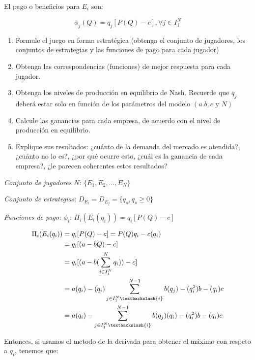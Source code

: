 \documentclass{homework}
\begin{document}
El pago o beneficios para $E_i$ son:

\begin{equation}
    \phi_j(Q) = q_j [P(Q)-c], \forall j \in I_{1}^{N}
\end{equation}


\begin{enumerate}
    \item Formule el juego en forma estratégica (obtenga el conjunto de jugadores, los conjuntos de estrategias y las funciones de pago para cada jugador)
    \item Obtenga las correspondencias (funciones) de mejor respuesta para cada jugador.
    \item Obtenga los niveles de producción en equilibrio de Nash. Recuerde que $q_j$ deberá estar solo en función de los parámetros del modelo $(a.b,c\text{ y } N) $
    \item Calcule las ganancias para cada empresa, de acuerdo con el nivel de producción en equilibrio.
    \item Explique sus resultados: ¿cuánto de la demanda del mercado es atendida?, ¿cuánto no lo es?, ¿por qué ocurre esto, ¿cuál es la ganancia de cada empresa?, ¿le parecen coherentes estos resultados?
\end{enumerate}

\emph{Conjunto de jugadores $N$}: $\{ E_1, E_2, \dots, E_N \}$

\emph{Conjunto de estrategias}: $D_{E_i} =   D_{E_j} = \{ q_s, q_s \geq 0\}$

\emph{Funciones de pago: $\phi_i $}: $\Pi_i(E_i(q_i)) =  q_i [P(Q)-c] $

\begin{equation}
\begin{split}
    \Pi_i(E_i(q_i)) &=  q_i [P(Q)-c] = P(Q)q_i - c(q_i) \\
     &= q_i[(a - bQ) - c] \\
     &= q_i[(a-b(\sum_{i \in I_{1}^{N}}^{N}q_i)) -c] \\
     &= a(q_i) -(q_i)\sum_{j \in I_{1}^{N}\textbackslash \{ i\} }^{N-1}b(q_j) - (q_{i}^{2})b - (q_i)c \\
     &= a(q_i) -\sum_{j \in I_{1}^{N}\textbackslash \{ i\} }^{N-1}b(q_j)(q_i) - (q_{i}^{2})b - (q_i)c \\
\end{split}
\end{equation}

Entonces, si usamos el metodo de la derivada para obtener el máximo con respeto a $q_i$, tenemos que:
\end{document}
